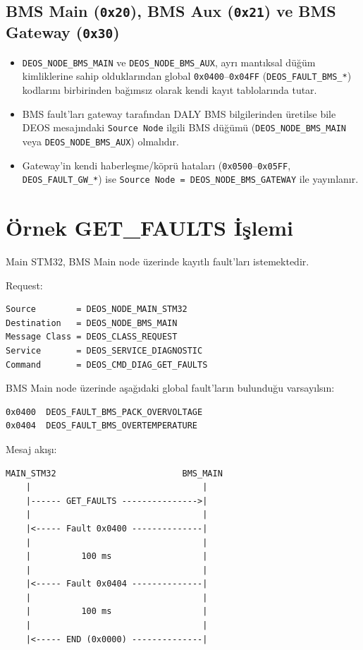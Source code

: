 \documentclass[a4paper,11pt]{article}
\newcommand{\hex}[1]{\texttt{0x#1}}
\newcommand{\code}[1]{\texttt{#1}}
\begin{document}
\subsection{BMS Main (\hex{20}), BMS Aux (\hex{21}) ve BMS Gateway (\hex{30})}

\begin{itemize}
    \item \code{DEOS\_NODE\_BMS\_MAIN} ve \code{DEOS\_NODE\_BMS\_AUX}, ayrı mantıksal düğüm kimliklerine sahip olduklarından global \hex{0400}--\hex{04FF} (\code{DEOS\_FAULT\_BMS\_*}) kodlarını birbirinden bağımsız olarak kendi kayıt tablolarında tutar.
    \item BMS fault'ları gateway tarafından DALY BMS bilgilerinden üretilse bile DEOS mesajındaki \code{Source Node} ilgili BMS düğümü (\code{DEOS\_NODE\_BMS\_MAIN} veya \code{DEOS\_NODE\_BMS\_AUX}) olmalıdır.
    \item Gateway'in kendi haberleşme/köprü hataları (\hex{0500}--\hex{05FF}, \code{DEOS\_FAULT\_GW\_*}) ise \code{Source Node = DEOS\_NODE\_BMS\_GATEWAY} ile yayınlanır.
\end{itemize}

\section{Örnek GET\_FAULTS İşlemi}

Main STM32, BMS Main node üzerinde kayıtlı fault'ları istemektedir.

Request:

\begin{lstlisting}
Source        = DEOS_NODE_MAIN_STM32
Destination   = DEOS_NODE_BMS_MAIN
Message Class = DEOS_CLASS_REQUEST
Service       = DEOS_SERVICE_DIAGNOSTIC
Command       = DEOS_CMD_DIAG_GET_FAULTS
\end{lstlisting}

BMS Main node üzerinde aşağıdaki global fault'ların bulunduğu varsayılsın:

\begin{lstlisting}
0x0400  DEOS_FAULT_BMS_PACK_OVERVOLTAGE
0x0404  DEOS_FAULT_BMS_OVERTEMPERATURE
\end{lstlisting}

Mesaj akışı:

\begin{lstlisting}
MAIN_STM32                         BMS_MAIN
    |                                  |
    |------ GET_FAULTS --------------->|
    |                                  |
    |<----- Fault 0x0400 --------------|
    |                                  |
    |          100 ms                  |
    |                                  |
    |<----- Fault 0x0404 --------------|
    |                                  |
    |          100 ms                  |
    |                                  |
    |<----- END (0x0000) --------------|
\end{lstlisting}
\end{document}
